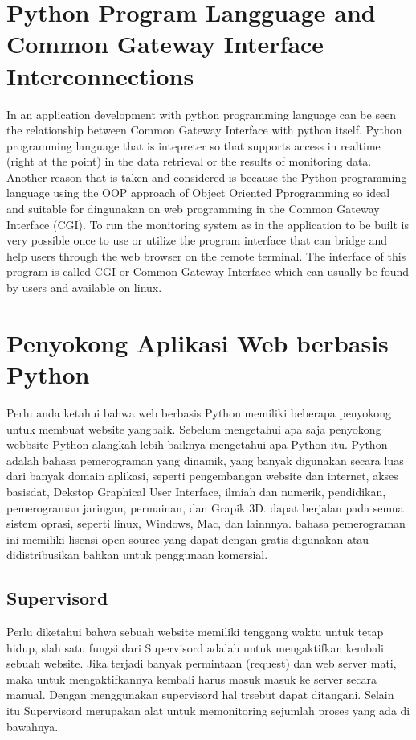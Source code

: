 \section{ Python Program Langguage and Common Gateway Interface Interconnections }
In an application development with python programming language can be seen the relationship between Common Gateway Interface with python itself. Python programming language that is intepreter so that supports access in realtime (right at the point) in the data retrieval or the results of monitoring data. Another reason that is taken and considered is because the Python programming language using the OOP approach of Object Oriented Pprogramming so ideal and suitable for dingunakan on web programming in the Common Gateway Interface (CGI). To run the monitoring system as in the application to be built is very possible once to use or utilize the program interface that can bridge and help users through the web browser on the remote terminal. The interface of this program is called CGI or Common Gateway Interface which can usually be found by users and available on linux.

\section{Penyokong Aplikasi Web berbasis Python}
\par Perlu anda ketahui bahwa web berbasis Python memiliki beberapa penyokong untuk membuat website yangbaik.
Sebelum mengetahui apa saja penyokong webbsite Python alangkah lebih baiknya mengetahui apa Python itu.
Python adalah bahasa pemerograman yang dinamik, yang banyak digunakan secara luas dari banyak domain aplikasi, 
seperti pengembangan website dan internet, akses basisdat, Dekstop Graphical User Interface, ilmiah dan numerik, pendidikan,
pemerograman jaringan, permainan, dan Grapik 3D. dapat berjalan pada semua sistem oprasi, seperti linux, Windows, Mac, dan lainnnya.
bahasa pemerograman ini memiliki lisensi open-source yang dapat dengan gratis digunakan atau didistribusikan bahkan untuk penggunaan komersial\cite{andros2015implementasi}.

\subsection{Supervisord}
\par Perlu diketahui bahwa sebuah website memiliki tenggang waktu untuk tetap hidup, slah satu fungsi dari Supervisord adalah untuk mengaktifkan 
kembali sebuah website. Jika terjadi banyak permintaan (request) dan web server mati, maka untuk mengaktifkannya kembali harus masuk masuk ke server secara manual.
Dengan menggunakan supervisord hal trsebut dapat ditangani. Selain itu Supervisord merupakan alat untuk memonitoring sejumlah proses yang ada di bawahnya.  

